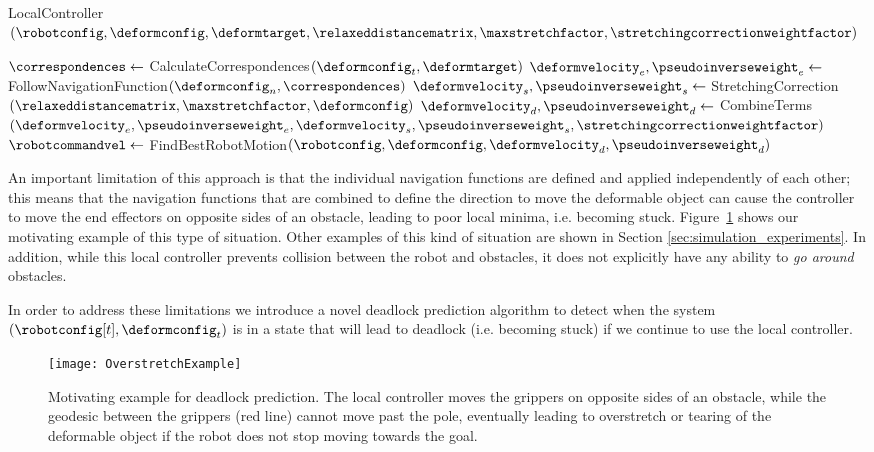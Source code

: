 \begin{algorithm}[t]
    \caption{LocalController$(\robotconfig, \deformconfig, \deformtarget, \relaxeddistancematrix, \maxstretchfactor, \stretchingcorrectionweightfactor)$}
    \begin{algorithmic}[1]
        \State $\correspondences \gets$ CalculateCorrespondences$(\deformconfig_t, \deformtarget)$
        \State $\deformvelocity_e, \pseudoinverseweight_e \gets$ FollowNavigationFunction$(\deformconfig_n, \correspondences)$
        \State $\deformvelocity_s, \pseudoinverseweight_s \gets$ StretchingCorrection$(\relaxeddistancematrix, \maxstretchfactor, \deformconfig)$
        \State $\deformvelocity_d, \pseudoinverseweight_d \gets$ CombineTerms$(\deformvelocity_e, \pseudoinverseweight_e, \deformvelocity_s, \pseudoinverseweight_s, \stretchingcorrectionweightfactor)$
        \State $\robotcommandvel \gets$ FindBestRobotMotion$(\robotconfig, \deformconfig, \deformvelocity_d, \pseudoinverseweight_d)$
    \end{algorithmic}
    \label{alg:local_controller}
\end{algorithm}


An important limitation of this approach is that the individual navigation functions are defined and applied independently of each other; this means that the navigation functions that are combined to define the direction to move the deformable object can cause the controller to move the end effectors on opposite sides of an obstacle, leading to poor local minima, i.e. becoming stuck. Figure~\ref{fig:overstretch_example} shows our motivating example of this type of situation. Other examples of this kind of situation are shown in Section \ref{sec:simulation_experiments}. In addition, while this local controller prevents collision between the robot and obstacles, it does not explicitly have any ability to \textit{go around} obstacles.

In order to address these limitations we introduce a novel deadlock prediction algorithm to detect when the system $(\robotconfig[t], \deformconfig_t)$ is in a state that will lead to deadlock (i.e. becoming stuck) if we continue to use the local controller.


\begin{figure}[t]
    \centering
    \texttt{[image: OverstretchExample]}
    \caption{Motivating example for deadlock prediction. The local controller moves the grippers on opposite sides of an obstacle, while the geodesic between the grippers (red line) cannot move past the pole, eventually leading to overstretch or tearing of the deformable object if the robot does not stop moving towards the goal.}
    \label{fig:overstretch_example}
\end{figure}



